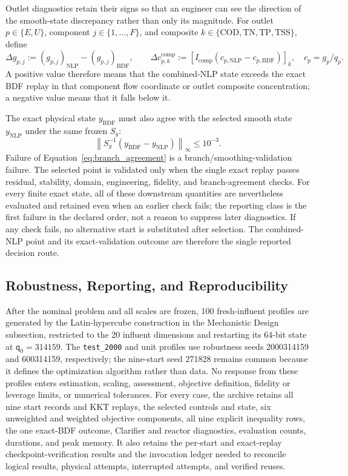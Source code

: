 \documentclass[a4paper,fleqn]{cas-sc}
\begin{document}
Outlet diagnostics retain their signs so that an engineer can see the direction of the smooth-state discrepancy rather than only its magnitude. For outlet $p\in\{E,U\}$, component $j\in\{1,\ldots,F\}$, and composite $k\in\{\mathrm{COD,TN,TP,TSS}\}$, define
\begin{equation}
\label{eq:outlet_signed_differences}
\Delta g_{p,j}:=(g_{p,j})_{\mathrm{NLP}}-(g_{p,j})_{\mathrm{BDF}},
\qquad
\Delta c^{\mathrm{comp}}_{p,k}:=\left[I_{\mathrm{comp}}
(c_{p,\mathrm{NLP}}-c_{p,\mathrm{BDF}})\right]_k,
\quad c_p=g_p/q_p.
\end{equation}
A positive value therefore means that the combined-NLP state exceeds the exact BDF replay in that component flow coordinate or outlet composite concentration; a negative value means that it falls below it.

The exact physical state $y_{\mathrm{BDF}}$ must also agree with the selected smooth state $y_{\mathrm{NLP}}$ under the same frozen $S_y$:
\begin{equation}
\label{eq:branch_agreement}
\left\|S_y^{-1}(y_{\mathrm{BDF}}-y_{\mathrm{NLP}})\right\|_\infty
\leq10^{-3}.
\end{equation}
Failure of Equation~\eqref{eq:branch_agreement} is a branch/smoothing-validation failure. The selected point is validated only when the single exact replay passes residual, stability, domain, engineering, fidelity, and branch-agreement checks. For every finite exact state, all of these downstream quantities are nevertheless evaluated and retained even when an earlier check fails; the reporting class is the first failure in the declared order, not a reason to suppress later diagnostics. If any check fails, no alternative start is substituted after selection. The combined-NLP point and its exact-validation outcome are therefore the single reported decision route.

\subsection{Robustness, Reporting, and Reproducibility}

After the nominal problem and all scales are frozen, 100 fresh-influent profiles are generated by the Latin-hypercube construction in the Mechanistic Design subsection, restricted to the 20 influent dimensions and restarting its 64-bit state at $\mathsf q_0=314159$. The \texttt{test\_2000} and unit profiles use robustness seeds 2000314159 and 600314159, respectively; the nine-start seed 271828 remains common because it defines the optimization algorithm rather than data. No response from these profiles enters estimation, scaling, assessment, objective definition, fidelity or leverage limits, or numerical tolerances. For every case, the archive retains all nine start records and KKT replays, the selected controls and state, six unweighted and weighted objective components, all nine explicit inequality rows, the one exact-BDF outcome, Clarifier and reactor diagnostics, evaluation counts, durations, and peak memory. It also retains the per-start and exact-replay checkpoint-verification results and the invocation ledger needed to reconcile logical results, physical attempts, interrupted attempts, and verified reuses.
\end{document}
